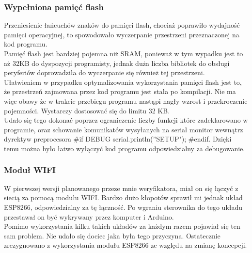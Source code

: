 \documentclass[declaration,shortabstract, mgr]{iithesis}
\begin{document}
\subsubsection{Wypełniona pamięć flash}
\indent Przeniesienie łańcuchów znaków do pamięci flash, chociaż poprawiło wydajność pamięci operacyjnej, to spowodowało wyczerpanie przestrzeni przeznaczonej na kod programu. \\
\indent Pamięć flash jest bardziej pojemna niż SRAM, ponieważ w tym wypadku jest to aż 32KB do dyspozycji programisty, jednak duża liczba bibliotek do obsługi peryferiów doprowadziła do wyczerpanie się również tej przestrzeni. \\
\indent Ułatwieniem w przypadku optymalizowania wykorzystania pamięci flash jest to, że przestrzeń zajmowana przez kod programu jest stała po kompilacji. Nie ma więc obawy że w trakcie przebiegu programu nastąpi nagły wzrost i przekroczenie pojemności. Wystarczy dostosować się do limitu 32 KB. \\
\indent Udało się tego dokonać poprzez ograniczenie liczby funkcji które zadeklarowano w programie, oraz schowanie komunikatów wysyłanych na serial monitor wewnątrz dyrektyw preprocesora \#if DEBUG serial.println(''SETUP"); \#endif. Dzięki temu można było łatwo wyłączyć kod programu odpowiedzialny za debugowanie.\\
\subsubsection{Moduł WIFI}
\indent W pierwszej wersji planowanego przeze mnie weryfikatora, miał on się łączyć z siecią za pomocą modułu WIFI. Bardzo dużo kłopotów sprawił mi jednak układ ESP8266, odpowiedzialny za tę łączność. Po wgraniu sterownika do tego układu przestawał on być wykrywany przez komputer i Arduino.\\ 
\indent Pomimo wykorzystania kilku takich układów za każdym razem pojawiał się ten sam problem. Nie udało się dociec jaka była tego przyczyna. Ostatecznie zrezygnowano z wykorzystania modułu ESP8266 ze względu na zmianę koncepcji.
\end{document}

